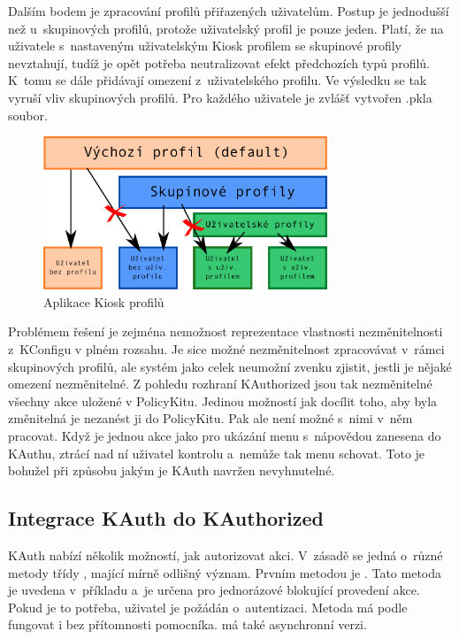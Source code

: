 Dalším bodem je zpracování profilů přiřazených uživatelům. Postup je jednodušší než u~skupinových profilů, protože uživatelský profil je pouze jeden. Platí, že na uživatele s~nastaveným uživatelským Kiosk profilem se skupinové profily nevztahují, tudíž je opět potřeba neutralizovat efekt předchozích typů profilů. K~tomu se dále přidávají omezení z~uživatelského profilu. Ve výsledku se tak vyruší vliv skupinových profilů. Pro každého uživatele je zvlášť vytvořen .pkla soubor.

\begin{figure}[h]
    \centering
    \includegraphics[width=8.5cm]{obrazky/profily.pdf}
    \caption{Aplikace Kiosk profilů}
    \label{fig:konv_profily}
\end{figure}

Problémem řešení je zejména nemožnost reprezentace vlastnosti nezměnitelnosti z~KConfigu v plném rozsahu. Je sice možné nezměnitelnost zpracovávat v~rámci skupinových profilů, ale systém jako celek neumožní zvenku zjistit, jestli je nějaké omezení nezměnitelné. Z pohledu rozhraní KAuthorized jsou tak nezměnitelné všechny akce uložené v PolicyKitu. Jedinou možností jak docílit toho, aby byla změnitelná je nezanést ji do PolicyKitu. Pak ale není možné s~nimi v~něm pracovat. Když je jednou akce jako  pro ukázání menu s~nápovědou zanesena do KAuthu, ztrácí nad ní uživatel kontrolu a~nemůže tak menu schovat. Toto je bohužel při způsobu jakým je KAuth navržen nevyhnutelné.

\subsection*{Integrace KAuth do KAuthorized}
KAuth nabízí několik možností, jak autorizovat akci. V~zásadě se jedná o~různé metody třídy , mající mírně odlišný význam. Prvním metodou je . Tato metoda je uvedena v~příkladu \cite{KAuthusage} a~je určena pro jednorázové blokující provedení akce. Pokud je to potřeba, uživatel je požádán o~autentizaci. Metoda má podle \cite{KAuthusage} fungovat i bez přítomnosti pomocníka.  má také asynchronní verzi.

